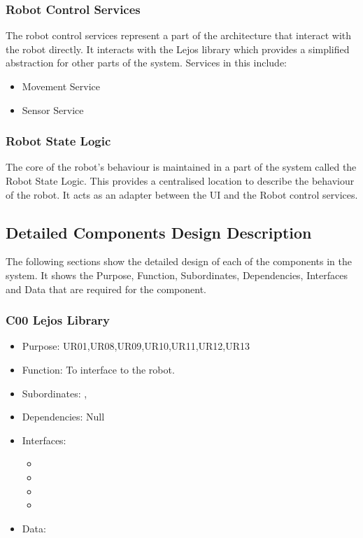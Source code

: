\subsubsection*{Robot Control Services}
The robot control services represent a part of the architecture that interact with the robot directly. It interacts with the Lejos library which provides a simplified abstraction for other parts of the system. Services in this include:

\begin{itemize}
	\item Movement Service
	\item Sensor Service
\end{itemize}

\subsubsection*{Robot State Logic}
The core of the robot's behaviour is maintained in a part of the system called the Robot State Logic. This provides a centralised location to describe the behaviour of the robot. It acts as an adapter between the UI and the Robot control services.

\subsection{Detailed Components Design Description}\label{detailedSection}
The following sections show the detailed design of each of the components in the system. It shows the Purpose, Function, Subordinates, Dependencies, Interfaces and Data that are required for the component.

\subsubsection{C00 Lejos Library}\label{compLejos}
\begin{itemize}
	\item Purpose: UR01,UR08,UR09,UR10,UR11,UR12,UR13
	\item Function: To interface to the robot. 
	\item Subordinates: ,  
	\item Dependencies: Null
	\item Interfaces:
	\begin{itemize}
		\item \texttt{}
		\item \texttt{}
		\item \texttt{}
		\item \texttt{}
	\end{itemize}
	\item Data:
\end{itemize}

